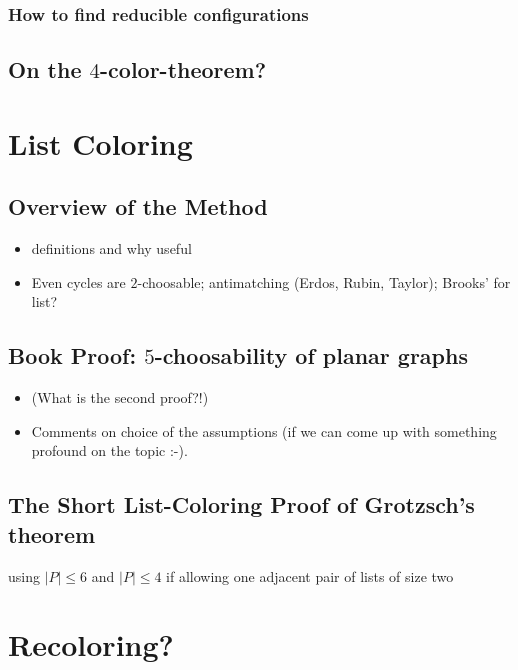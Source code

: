 \documentclass[12pt,twoside,openright,a4paper]{book}
\begin{document}
\subsection{How to find reducible configurations}\label{ssec:howto-redu}

\section{On the $4$-color-theorem?}

\chapter{List Coloring}


\section{Overview of the Method}
\begin{itemize}
\item definitions and why useful
\item Even cycles are $2$-choosable; antimatching (Erdos, Rubin, Taylor); Brooks' for list?
\end{itemize}

\section{Book Proof: $5$-choosability of planar graphs}

\begin{itemize}
\item (What is the second proof?!)
\item Comments on choice of the assumptions (if we can come up with something profound on the topic :-).
\end{itemize}

\section{The Short List-Coloring Proof of Grotzsch's theorem}

using $|P|\le 6$ and $|P|\le 4$ if allowing one adjacent pair of lists of size two

\chapter{Recoloring?}

\end{document}
